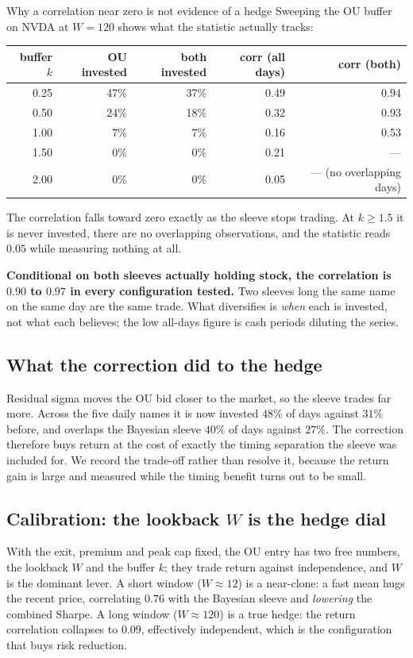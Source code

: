 \documentclass[11pt]{article}
\begin{document}
\begin{fixbox}{Why a correlation near zero is not evidence of a hedge}
Sweeping the OU buffer on NVDA at $W=120$ shows what the statistic actually tracks:

\begin{center}\small
\begin{tabular}{rrrrr}
\toprule
\textbf{buffer $k$} & \textbf{OU invested} & \textbf{both invested} & \textbf{corr (all days)} &
\textbf{corr (both)}\\
\midrule
0.25 & 47\% & 37\% & 0.49 & 0.94\\
0.50 & 24\% & 18\% & 0.32 & 0.93\\
1.00 & 7\%  & 7\%  & 0.16 & 0.53\\
1.50 & 0\%  & 0\%  & 0.21 & ---\\
2.00 & 0\%  & 0\%  & 0.05 & --- (no overlapping days)\\
\bottomrule
\end{tabular}
\end{center}

The correlation falls toward zero exactly as the sleeve stops trading. At $k\ge1.5$ it is never
invested, there are no overlapping observations, and the statistic reads $0.05$ while measuring
nothing at all.

\textbf{Conditional on both sleeves actually holding stock, the correlation is $0.90$ to $0.97$ in
every configuration tested.} Two sleeves long the same name on the same day are the same trade.
What diversifies is \emph{when} each is invested, not what each believes; the low all-days figure
is cash periods diluting the series.
\end{fixbox}

\subsection{What the correction did to the hedge}

Residual sigma moves the OU bid closer to the market, so the sleeve trades far more. Across the
five daily names it is now invested $48\%$ of days against $31\%$ before, and overlaps the
Bayesian sleeve $40\%$ of days against $27\%$. The correction therefore buys return at the cost of
exactly the timing separation the sleeve was included for. We record the trade-off rather than
resolve it, because the return gain is large and measured while the timing benefit turns out to be
small.

\subsection{Calibration: the lookback $W$ is the hedge dial}
With the exit, premium and peak cap fixed, the OU entry has two free numbers, the lookback $W$
and the buffer $k$; they trade return against independence, and $W$ is the dominant lever. A
short window ($W\approx12$) is a near-clone: a fast mean hugs the recent price, correlating
$0.76$ with the Bayesian sleeve and \emph{lowering} the combined Sharpe. A long window
($W\approx120$) is a true hedge: the return correlation collapses to $0.09$, effectively
independent, which is the configuration that buys risk reduction.
\end{document}
